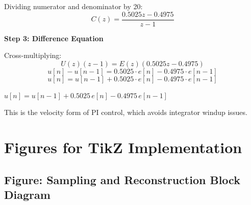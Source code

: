 \begin{example}
Dividing numerator and denominator by 20:
\begin{equation*}
C(z) = \frac{0.5025z - 0.4975}{z - 1}
\end{equation*}

\textbf{Step 3: Difference Equation}

Cross-multiplying:
\begin{equation*}
U(z)(z - 1) = E(z)(0.5025z - 0.4975)
\end{equation*}
\begin{equation*}
u[n] - u[n-1] = 0.5025 \cdot e[n] - 0.4975 \cdot e[n-1]
\end{equation*}
\begin{equation*}
u[n] = u[n-1] + 0.5025 \cdot e[n] - 0.4975 \cdot e[n-1]
\end{equation*}

$\boxed{u[n] = u[n-1] + 0.5025 \, e[n] - 0.4975 \, e[n-1]}$

This is the velocity form of PI control, which avoids integrator windup issues.
\end{example}

\section{Figures for TikZ Implementation}
\label{sec:tikz}

\subsection{Figure: Sampling and Reconstruction Block Diagram}


